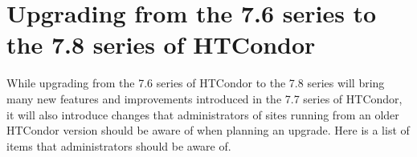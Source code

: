 \section{\label{sec:gotchas}Upgrading from the 7.6 series to the 7.8 series of HTCondor}

While upgrading from the 7.6 series of HTCondor to the 7.8 series will bring many
new features and improvements introduced in the 7.7 series of HTCondor, it will
also introduce changes that administrators of sites running from an older
HTCondor version should be aware of when planning an upgrade.  Here is a list of
items that administrators should be aware of.

